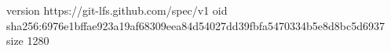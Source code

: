 version https://git-lfs.github.com/spec/v1
oid sha256:6976e1bffae923a19af68309eea84d54027dd39fbfa5470334b5e8d8bc5d6937
size 1280

